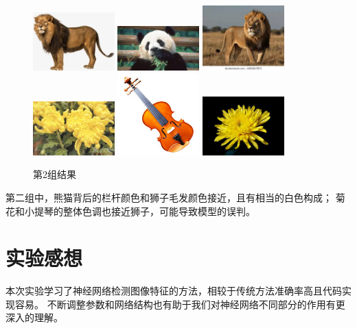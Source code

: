 \documentclass{article}
\begin{document}
\begin{figure}[h]
\centering
\includegraphics[width=0.28\textwidth]{./CNN/target/2lion}
\includegraphics[width=0.28\textwidth]{./CNN/dataset/5}
\includegraphics[width=0.28\textwidth]{./CNN/dataset/13}
\includegraphics[width=0.28\textwidth]{./CNN/dataset/35}
\includegraphics[width=0.28\textwidth]{./CNN/dataset/50}
\includegraphics[width=0.28\textwidth]{./CNN/dataset/33}
\caption{第2组结果}
\end{figure}

    第二组中，熊猫背后的栏杆颜色和狮子毛发颜色接近，且有相当的白色构成；
    菊花和小提琴的整体色调也接近狮子，可能导致模型的误判。

\section{实验感想}

    本次实验学习了神经网络检测图像特征的方法，相较于传统方法准确率高且代码实现容易。
    不断调整参数和网络结构也有助于我们对神经网络不同部分的作用有更深入的理解。
\end{document}
